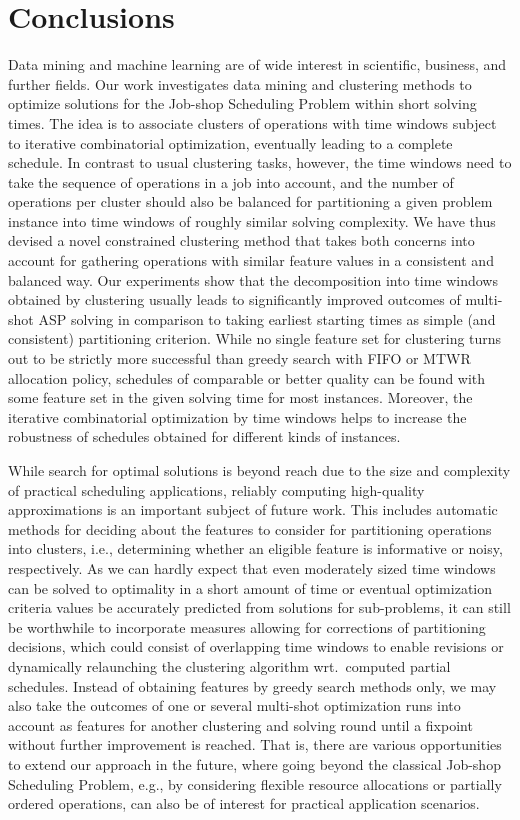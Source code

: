 \documentclass[runningheads]{llncs}
\begin{document}
\section{Conclusions}
\label{sec:conclusions}
Data mining and machine learning are of wide interest in scientific, business, and further fields. %
Our work investigates data mining and clustering methods to optimize solutions for the Job-shop Scheduling Problem within short solving times.
The idea is to associate clusters of operations with time windows subject to iterative combinatorial optimization, eventually leading to a complete schedule.
In contrast to usual clustering tasks, however,
the time windows need to take the sequence of operations in a job into account,
and the number of operations per cluster should also be balanced for partitioning
a given problem instance into time windows of roughly similar solving complexity.
We have thus devised a novel constrained clustering method that takes both concerns
into account for gathering operations with similar feature values in a consistent and
balanced way.
Our experiments show that the decomposition into time windows obtained by clustering
usually leads to significantly improved outcomes of multi-shot ASP solving in comparison
to taking earliest starting times as simple (and consistent) partitioning criterion.
While no single feature set for clustering turns out to be strictly more successful than greedy search
with FIFO or MTWR allocation policy, schedules of comparable or better quality can be found
with some feature set in the given solving time for most instances.
Moreover, the iterative combinatorial optimization by time windows helps to increase
the robustness of schedules obtained for different kinds of instances.

While search for optimal solutions is beyond reach due to the size and complexity of
practical scheduling applications,
reliably computing high-quality approximations is an important subject of future work.
This includes automatic methods for deciding about the features to consider for
partitioning operations into clusters, i.e., determining whether an eligible feature is
informative or noisy, respectively.
As we can hardly expect that even moderately sized time windows can be solved to
optimality in a short amount of time or eventual optimization criteria values be
accurately predicted from solutions for sub-problems,
it can still be worthwhile to incorporate measures allowing for corrections of 
partitioning decisions, which could consist of overlapping time windows to enable
revisions or dynamically relaunching the clustering algorithm wrt.\ computed
partial schedules.
Instead of obtaining features by greedy search methods only, we may also take
the outcomes of one or several multi-shot optimization runs into account as
features for another clustering and solving round until a fixpoint without
further improvement is reached.
That is, there are various opportunities to extend our approach in the future,
where going beyond the classical Job-shop Scheduling Problem, e.g., by
considering flexible resource allocations or partially ordered operations,
can also be of interest for practical application scenarios.
\end{document}
